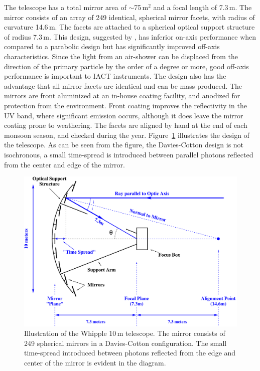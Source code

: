 The telescope has a total mirror area of $\sim$75\,m$^2$ and a focal
length of 7.3\,m. The mirror consists of an array of 249 identical,
spherical mirror facets, with radius of curvature 14.6\,m. The facets
are attached to a spherical optical support structure of radius
7.3\,m. This design, suggested by \citet{REF::DAVIESCOTTON::1957}, has
inferior on-axis performance when compared to a parabolic design but
has significantly improved off-axis characteristics. Since the
\Cerenkov light from an air-shower can be displaced from the direction
of the primary particle by the order of a degree or more, good
off-axis performance is important to IACT instruments. The design also
has the advantage that all mirror facets are identical and can be mass
produced. The mirrors are front aluminized at an in-house coating
facility, and anodized for protection from the environment. Front
coating improves the reflectivity in the UV band, where significant
\Cerenkov emission occurs, although it does leave the mirror coating
prone to weathering. The facets are aligned by hand at the end of each
monsoon season, and checked during the
year. Figure~\ref{FIG::INTRODUCTION::SCOPE} illustrates the design of
the telescope. As can be seen from the figure, the Davies-Cotton
design is not isochronous, a small time-spread is introduced between
parallel photons reflected from the center and edge of the mirror.

\begin{figure}[p]
\centerline{\includegraphics[height=0.4\textheight]{plots/chap-introduction/scope.pdf}}
\caption{\label{FIG::INTRODUCTION::SCOPE} Illustration of the Whipple 
10\,m telescope. The mirror consists of 249 spherical mirrors in a
Davies-Cotton configuration. The small time-spread introduced between
photons reflected from the edge and center of the mirror is evident
in the diagram.}
\end{figure}

